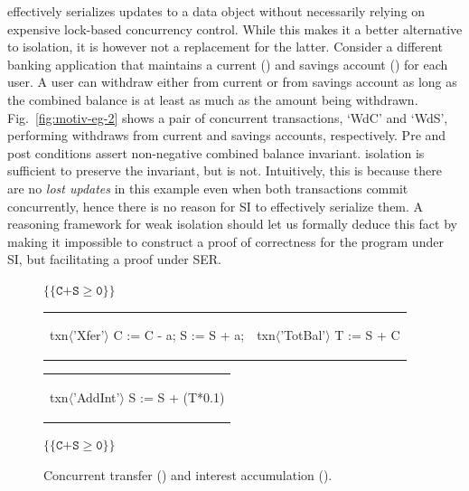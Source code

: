  effectively serializes updates to a data
object without necessarily relying on expensive lock-based concurrency
control. While this makes it a better alternative to
 isolation, it is however not a replacement for the
latter. Consider a different banking application that maintains a
current () and savings account () for each user. A user can
withdraw either from current or from savings account as long as the
combined balance is at least as much as the amount being withdrawn.
Fig.~\ref{fig:motiv-eg-2} shows a pair of concurrent transactions,
`WdC' and `WdS', performing withdraws from current and savings
accounts, respectively. Pre and post conditions assert non-negative
combined balance invariant.  isolation is sufficient
to preserve the invariant, but  is not.
Intuitively, this is because there are no \emph{lost updates} in this
example even when both transactions commit concurrently, hence there
is no reason for SI to effectively serialize them. A reasoning
framework for weak isolation should let us formally deduce this fact
by making it impossible to construct a proof of correctness for the
program under SI, but facilitating a proof under SER.

\begin{figure}[t]
\centering
$\{\{\texttt{C+S}\ge\texttt{0}\}\}$
\begin{tabular}{l||l||}
\begin{txnimpcode}
  txn$\langle$'Xfer'$\rangle${
    C := C - a;
    S := S + a;
  }
\end{txnimpcode}
&
\begin{txnimpcode}
  txn$\langle$'TotBal'$\rangle${
    T := S + C
  }
\end{txnimpcode}
\end{tabular}
\begin{tabular}{c}
  \begin{txnimpcode}
    txn$\langle$'AddInt'$\rangle${
      S := S + (T*0.1)
    }
  \end{txnimpcode}
\end{tabular}

$\{\{\texttt{C+S}\ge\texttt{0}\}\}$

\caption{Concurrent transfer () and interest accumulation ().}
\label{fig:motiv-eg-3}
\end{figure}


